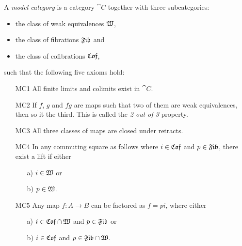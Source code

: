 \begin{definition}
	A \emph{model category} is a category $\cat{C}$ together with three subcategories:
	\begin{itemize}
		\item the class of weak equivalences $\mathfrak{W}$,
		\item the class of fibrations $\mathfrak{Fib}$ and
		\item the class of cofibrations $\mathfrak{Cof}$,
	\end{itemize}
	such that the following five axioms hold:
	\begin{itemize}
		\item[MC1] All finite limits and colimits exist in $\cat{C}$.
		\item[MC2] If $f$, $g$ and $fg$ are maps such that two of them are weak equivalences, then so it the third. This is called the \emph{2-out-of-3} property.
		\item[MC3] All three classes of maps are closed under retracts.
		\item[MC4] In any commuting square as follows where $i \in \mathfrak{Cof}$ and $p \in \mathfrak{Fib}$, there exist a lift if either 
		\begin{itemize}
			\item[a)] $i \in \mathfrak{W}$ or
			\item[b)] $p \in \mathfrak{W}$.
		\end{itemize}
		\item[MC5] Any map $f : A \to B$ can be factored as $f = pi$, where either
		\begin{itemize}
			\item[a)] $i \in \mathfrak{Cof} \cap \mathfrak{W}$ and $p \in \mathfrak{Fib}$ or
			\item[b)] $i \in \mathfrak{Cof}$ and $p \in \mathfrak{Fib} \cap \mathfrak{W}$.
		\end{itemize}
	\end{itemize}
\end{definition}

